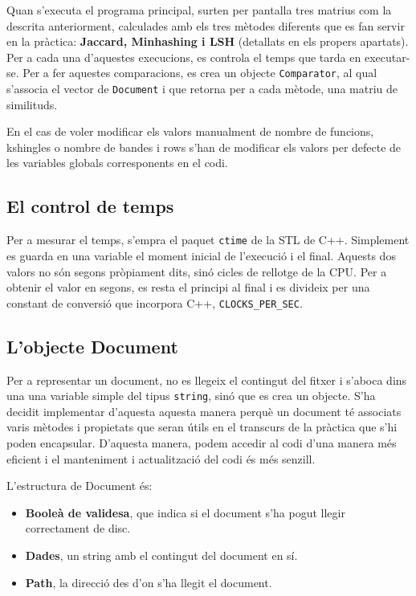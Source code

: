 \documentclass[catalan, 12pt]{report}
\begin{document}
Quan s'executa el programa principal, surten per pantalla tres matrius com la descrita anteriorment, calculades amb els tres mètodes diferents que es fan servir en la pràctica: \textbf{Jaccard, Minhashing i LSH} (detallats en els propers apartats). Per a cada una d'aquestes execucions, es controla el temps que tarda en executar-se. Per a fer aquestes comparacions, es crea un objecte \verb|Comparator|, al qual s'associa el vector de \verb|Document| i que retorna per a cada mètode, una matriu de similituds.

En el cas de voler modificar els valors manualment de nombre de funcions, kshingles o nombre de bandes i rows s'han de modificar els valors per defecte de les variables globals corresponents en el codi.

\subsection{El control de temps}

Per a mesurar el temps, s'empra el paquet \verb|ctime| de la STL de C++. Simplement es guarda en una variable el moment inicial de l'execució i el final. Aquests dos valors no són segons pròpiament dits, sinó cicles de rellotge de la CPU. Per a obtenir el valor en segons, es resta el principi al final i es divideix per una constant de conversió que incorpora C++, \verb|CLOCKS_PER_SEC|.

\subsection{L'objecte Document}

Per a representar un document, no es llegeix el contingut del fitxer i s'aboca dins una una variable simple del tipus \verb|string|, sinó que es crea un objecte. S'ha decidit implementar d'aquesta aquesta manera perquè un document té associats varis mètodes i propietats que seran útils en el transcurs de la pràctica que s'hi poden encapsular. D'aquesta manera, podem accedir al codi d'una manera més eficient i el manteniment i actualització del codi és més senzill.\newline

L'estructura de Document és:

\begin{itemize}
\item \textbf{Booleà de validesa}, que indica si el document s'ha pogut llegir correctament de disc.
\item \textbf{Dades}, un string amb el contingut del document en sí.
\item \textbf{Path}, la direcció des d'on s'ha llegit el document.
\end{itemize}
\end{document}
